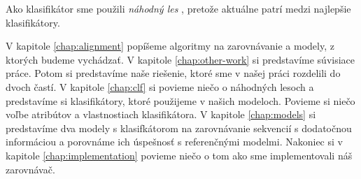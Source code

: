 
Ako klasifikátor sme použili \emph{náhodný les} \cite{randomForestPaper}, pretože aktuálne patrí medzi najlepšie klasifikátory.


V kapitole \ref{chap:alignment} popíšeme algoritmy na zarovnávanie a modely, z ktorých budeme vychádzať. V kapitole \ref{chap:other-work} si predstavíme súvisiace práce. Potom si predstavíme naše riešenie, ktoré sme v našej práci rozdelili do dvoch častí. V kapitole \ref{chap:clf} si povieme niečo o náhodných lesoch a predstavíme si klasifikátory, ktoré použijeme v našich modeloch. Povieme si niečo voľbe atribútov a vlastnostiach klasifikátora. V kapitole \ref{chap:models} si predstavíme dva modely s klasifkátorom na zarovnávanie sekvencií s dodatočnou informáciou a porovnáme ich úspešnosť s referenčnými modelmi. Nakoniec si v kapitole \ref{chap:implementation} povieme niečo o tom ako sme implementovali náš zarovnávač.
